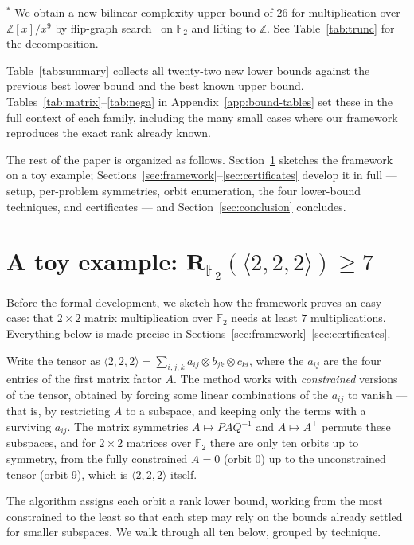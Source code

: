 \documentclass[11pt]{article}
\theoremstyle{definition}
\newcommand{\F}{\mathbb{F}}
\newcommand{\Rk}[2]{\mathbf{R}_{#1}(#2)}
\newcommand{\mmt}[3]{\langle #1,#2,#3\rangle}
\begin{document}
\begin{table}[!ht]
  \smallskip
  {\footnotesize\raggedright
    $^\ast$ We obtain a new bilinear complexity upper bound of $26$ for multiplication over $\mathbb{Z}[x]/x^9$ by flip-graph search~\cite{kauers2023flip} on $\F_2$ and lifting to $\mathbb{Z}$. See Table~\ref{tab:trunc} for the decomposition.
  \par}
  \caption{The 22 new lower bounds (4 matrix, 18 polynomial) proved in this paper.}
  \label{tab:summary}
\end{table}

Table~\ref{tab:summary} collects all twenty-two new
lower bounds against the previous best lower bound and the best known upper bound.
Tables~\ref{tab:matrix}--\ref{tab:nega} in Appendix~\ref{app:bound-tables} set these
in the full context of each family, including the many small cases where our
framework reproduces the exact rank already known.

The rest of the paper is organized as follows. Section~\ref{sec:toy} sketches the
framework on a toy example; Sections~\ref{sec:framework}--\ref{sec:certificates}
develop it in full --- setup, per-problem symmetries, orbit enumeration, the four
lower-bound techniques, and certificates --- and Section~\ref{sec:conclusion}
concludes.

\section{A toy example: $\Rk{\F_2}{\mmt{2}{2}{2}}\ge 7$}\label{sec:toy}

Before the formal development, we sketch how the framework proves an easy case: that
$2\times 2$ matrix multiplication over $\F_2$ needs at least $7$ multiplications.
Everything below is made precise in
Sections~\ref{sec:framework}--\ref{sec:certificates}.

Write the tensor as $\mmt{2}{2}{2}=\sum_{i,j,k} a_{ij}\otimes b_{jk}\otimes c_{ki}$,
where the $a_{ij}$ are the four entries of the first matrix factor $A$. The method
works with \emph{constrained} versions of the tensor, obtained by forcing some linear
combinations of the $a_{ij}$ to vanish --- that is, by restricting $A$ to a subspace,
and keeping only the terms with a surviving $a_{ij}$. The matrix symmetries
$A\mapsto PAQ^{-1}$ and $A\mapsto A^{\top}$ permute these subspaces, and for $2\times
2$ matrices over $\F_2$ there are only ten orbits up to symmetry,
from the fully constrained $A=0$ (orbit 0) up to the
unconstrained tensor (orbit 9), which is $\mmt{2}{2}{2}$ itself.

The algorithm assigns each orbit a rank lower bound, working from the most constrained
to the least so that each step may rely on the bounds already settled for smaller
subspaces. We walk through all ten below, grouped by technique.
\end{document}
